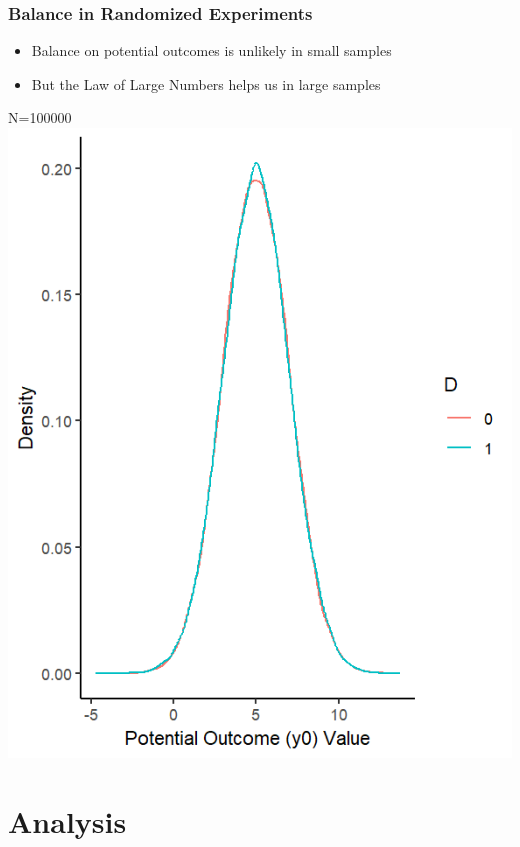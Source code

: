 \documentclass[xcolor=x11names,compress]{beamer}\usepackage[]{graphicx}\usepackage[]{color}
\makeatletter
\def\maxwidth{ %
  \ifdim\Gin@nat@width>\linewidth
    \linewidth
  \else
    \Gin@nat@width
  \fi
}
\newenvironment{knitrout}{}{} %
\renewcommand{\(}{\begin{columns}}
\renewcommand{\)}{\end{columns}}
\newcommand{\<}[1]{\begin{column}{#1}}
\renewcommand{\>}{\end{column}}
\makeatother
\begin{document}
\begin{frame}
\frametitle{Balance in Randomized Experiments}
\begin{multicols}{2}
\begin{itemize}
\item Balance on potential outcomes is unlikely in small samples
\item But the Law of Large Numbers helps us in large samples
\end{itemize}
\columnbreak
N=100000
\begin{knitrout}
\color{fgcolor}
\includegraphics[width=\maxwidth]{figure/balance_N7-1} 

\end{knitrout}
\end{multicols}
\end{frame}

\section{Analysis}
\end{document}
